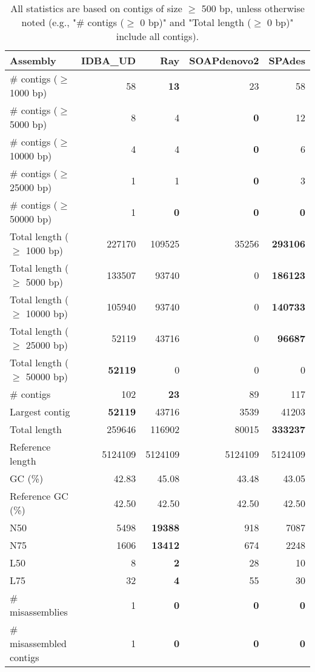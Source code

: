 \documentclass[12pt,a4paper]{article}
\begin{document}
\begin{table}[ht]
\begin{center}
\caption{All statistics are based on contigs of size $\geq$ 500 bp, unless otherwise noted (e.g., "\# contigs ($\geq$ 0 bp)" and "Total length ($\geq$ 0 bp)" include all contigs).}
\begin{tabular}{|l*{4}{|r}|}
\hline
Assembly & IDBA\_UD & Ray & SOAPdenovo2 & SPAdes \\ \hline
\# contigs ($\geq$ 1000 bp) & 58 & {\bf 13} & 23 & 58 \\ \hline
\# contigs ($\geq$ 5000 bp) & 8 & 4 & {\bf 0} & 12 \\ \hline
\# contigs ($\geq$ 10000 bp) & 4 & 4 & {\bf 0} & 6 \\ \hline
\# contigs ($\geq$ 25000 bp) & 1 & 1 & {\bf 0} & 3 \\ \hline
\# contigs ($\geq$ 50000 bp) & 1 & {\bf 0} & {\bf 0} & {\bf 0} \\ \hline
Total length ($\geq$ 1000 bp) & 227170 & 109525 & 35256 & {\bf 293106} \\ \hline
Total length ($\geq$ 5000 bp) & 133507 & 93740 & 0 & {\bf 186123} \\ \hline
Total length ($\geq$ 10000 bp) & 105940 & 93740 & 0 & {\bf 140733} \\ \hline
Total length ($\geq$ 25000 bp) & 52119 & 43716 & 0 & {\bf 96687} \\ \hline
Total length ($\geq$ 50000 bp) & {\bf 52119} & 0 & 0 & 0 \\ \hline
\# contigs & 102 & {\bf 23} & 89 & 117 \\ \hline
Largest contig & {\bf 52119} & 43716 & 3539 & 41203 \\ \hline
Total length & 259646 & 116902 & 80015 & {\bf 333237} \\ \hline
Reference length & 5124109 & 5124109 & 5124109 & 5124109 \\ \hline
GC (\%) & 42.83 & 45.08 & 43.48 & 43.05 \\ \hline
Reference GC (\%) & 42.50 & 42.50 & 42.50 & 42.50 \\ \hline
N50 & 5498 & {\bf 19388} & 918 & 7087 \\ \hline
N75 & 1606 & {\bf 13412} & 674 & 2248 \\ \hline
L50 & 8 & {\bf 2} & 28 & 10 \\ \hline
L75 & 32 & {\bf 4} & 55 & 30 \\ \hline
\# misassemblies & 1 & {\bf 0} & {\bf 0} & {\bf 0} \\ \hline
\# misassembled contigs & 1 & {\bf 0} & {\bf 0} & {\bf 0} \\ \hline

\end{tabular}
\end{center}
\end{table}
\end{document}
